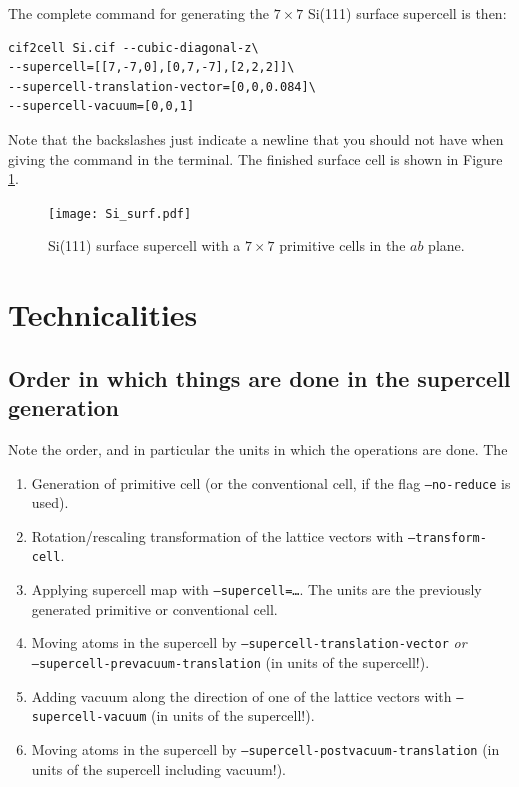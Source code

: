 \documentclass[11pt]{article}
\begin{document}
The complete command for generating the $7\times7$ Si(111) surface supercell is then:
\begin{Verbatim}[fontsize=\small]
cif2cell Si.cif --cubic-diagonal-z\
--supercell=[[7,-7,0],[0,7,-7],[2,2,2]]\
--supercell-translation-vector=[0,0,0.084]\
--supercell-vacuum=[0,0,1]
\end{Verbatim}
Note that the backslashes just indicate a newline that you should not have when giving the command in the terminal. The finished surface cell is shown in Figure \ref{surfSi}.

\begin{figure}[htbp] %
   \centering
   \texttt{[image: Si\_surf.pdf]} 
   \caption{Si(111) surface supercell with a $7\times7$ primitive cells in the $ab$ plane.}
   \label{surfSi}
\end{figure}



\newpage
\appendix
\section{Technicalities}\label{techappendix}

\subsection{Order in which things are done in the supercell generation}
Note the order, and in particular the units in which the operations are done. The 
\begin{enumerate}
\item Generation of primitive cell (or the conventional cell, if the flag \texttt{--no-reduce} is used).
\item Rotation/rescaling transformation of the lattice vectors with \texttt{--transform-cell}.
\item Applying supercell map with \texttt{--supercell=\ldots}. The units are the previously generated primitive or conventional cell.
\item Moving atoms in the supercell by \texttt{--supercell-translation-vector} \emph{or} \\ \texttt{--supercell-prevacuum-translation} (in units of the supercell!).
\item Adding vacuum along the direction of one of the lattice vectors with \texttt{--supercell-vacuum} (in units of the supercell!).
\item Moving atoms in the supercell by \texttt{--supercell-postvacuum-translation} (in units of the supercell including vacuum!).
\end{enumerate}
\end{document}
